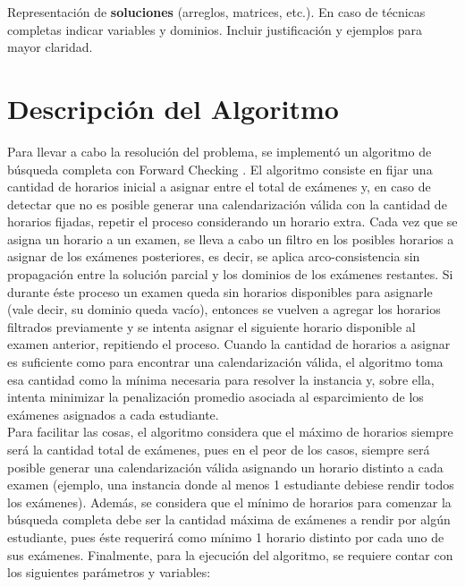 \documentclass[letter, 10pt]{article}
\begin{document}
Representaci\'on de \textbf{soluciones} (arreglos, matrices, etc.). En caso de t\'ecnicas completas indicar variables y dominios. Incluir justificaci\'on y ejemplos para mayor claridad.

\section{Descripción del Algoritmo}

Para llevar a cabo la resolución del problema, se implementó un algoritmo de búsqueda completa con Forward Checking \cite{forwardchecking}. El algoritmo consiste en fijar una cantidad de horarios inicial a asignar entre el total de exámenes y, en caso de detectar que no es posible generar una calendarización válida con la cantidad de horarios fijadas, repetir el proceso considerando un horario extra. Cada vez que se asigna un horario a un examen, se lleva a cabo un filtro en los posibles horarios a asignar de los exámenes posteriores, es decir, se aplica arco-consistencia sin propagación entre la solución parcial y los dominios de los exámenes restantes. Si durante éste proceso un examen queda sin horarios disponibles para asignarle (vale decir, su dominio queda vacío), entonces se vuelven a agregar los horarios filtrados previamente y se intenta asignar el siguiente horario disponible al examen anterior, repitiendo el proceso. Cuando la cantidad de horarios a asignar es suficiente como para encontrar una calendarización válida, el algoritmo toma esa cantidad como la mínima necesaria para resolver la instancia y, sobre ella, intenta minimizar la penalización promedio asociada al esparcimiento de los exámenes asignados a cada estudiante.\\

Para facilitar las cosas, el algoritmo considera que el máximo de horarios siempre será la cantidad total de exámenes, pues en el peor de los casos, siempre será posible generar una calendarización válida asignando un horario distinto a cada examen (ejemplo, una instancia donde al menos 1 estudiante debiese rendir todos los exámenes). Además, se considera que el mínimo de horarios para comenzar la búsqueda completa debe ser la cantidad máxima de exámenes a rendir por algún estudiante, pues éste requerirá como mínimo 1 horario distinto por cada uno de sus exámenes. Finalmente, para la ejecución del algoritmo, se requiere contar con los siguientes parámetros y variables:
\end{document}

